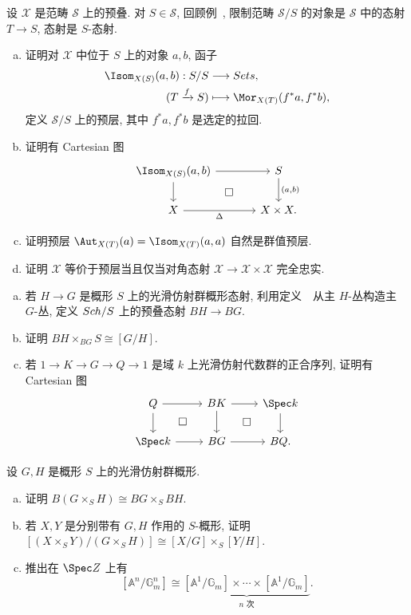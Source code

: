 \begin{exercise}[Isom 预层, 重要]\label{src:3.4.39}
设 $\mathcal X$ 是范畴 $\mathcal S$ 上的预叠. 对 $S\in\mathcal S$, 回顾例~, 限制范畴 $\mathcal S/S$ 的对象是 $\mathcal S$ 中的态射 $T\to S$, 态射是 $S$-态射.
\begin{enumerate}[(a)]
\item 证明对 $\mathcal X$ 中位于 $S$ 上的对象 $a,b$, 函子
\[
\begin{aligned}
\Isom_{\mathcal X(S)}(a,b):\mathcal S/S&\longrightarrow\Sets,\\
(T\xrightarrow{f}S)&\longmapsto\Mor_{\mathcal X(T)}(f^*a,f^*b),
\end{aligned}
\]
定义 $\mathcal S/S$ 上的预层, 其中 $f^*a,f^*b$ 是选定的拉回.
\item 证明有 Cartesian 图
\[
\begin{tikzcd}[column sep=large]
\Isom_{\mathcal X(S)}(a,b)\arrow[r]\arrow[d]\arrow[dr,phantom,"\square"]&
S\arrow[d,"{(a,b)}"]\\
\mathcal X\arrow[r,"\Delta"']&\mathcal X\times\mathcal X.
\end{tikzcd}
\]
\item 证明预层 $\Aut_{\mathcal X(T)}(a)=\Isom_{\mathcal X(T)}(a,a)$ 自然是群值预层.
\item 证明 $\mathcal X$ 等价于预层当且仅当对角态射 $\mathcal X\to\mathcal X\times\mathcal X$ 完全忠实.
\end{enumerate}
\end{exercise}
\begin{exercise}[有益的练习]\label{src:3.4.40}
\begin{enumerate}[(a)]
\item 若 $H\to G$ 是概形 $S$ 上的光滑仿射群概形态射, 利用定义~~从主 $H$-丛构造主 $G$-丛, 定义 $Sch/S$ 上的预叠态射 $BH\to BG$.
\item 证明 $BH\times_{BG}S\cong[G/H]$.
\item 若 $1\to K\to G\to Q\to1$ 是域 $k$ 上光滑仿射代数群的正合序列, 证明有 Cartesian 图
\[
\begin{tikzcd}
Q\arrow[r]\arrow[d]\arrow[dr,phantom,"\square"]&
BK\arrow[r]\arrow[d]\arrow[dr,phantom,"\square"]&
\Spec k\arrow[d]\\
\Spec k\arrow[r]&BG\arrow[r]&BQ.
\end{tikzcd}
\]
\end{enumerate}
\end{exercise}
\begin{exercise}[有益的练习]\label{src:3.4.41}
设 $G,H$ 是概形 $S$ 上的光滑仿射群概形.
\begin{enumerate}[(a)]
\item 证明 $B(G\times_S H)\cong BG\times_S BH$.
\item 若 $X,Y$ 是分别带有 $G,H$ 作用的 $S$-概形, 证明 $[(X\times_S Y)/(G\times_S H)]\cong[X/G]\times_S[Y/H]$.
\item 推出在 $\Spec\mathbb Z$ 上有
\[
[\mathbb A^n/\mathbb G_m^n]\cong
\underbrace{[\mathbb A^1/\mathbb G_m]\times\cdots\times[\mathbb A^1/\mathbb G_m]}_{n\text{ 次}}.
\]
\end{enumerate}
\end{exercise}

